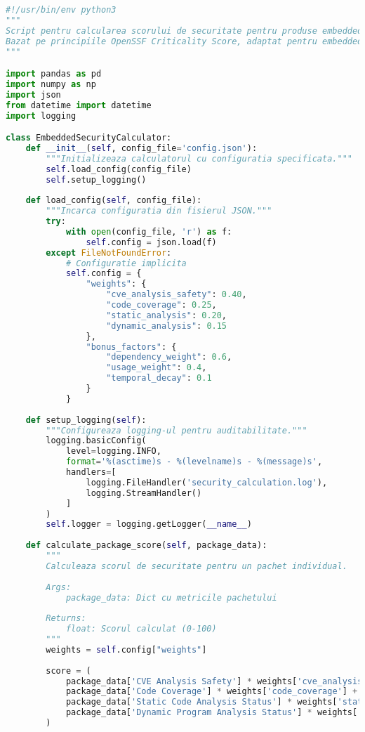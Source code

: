 \documentclass[12pt,a4paper]{article}
\begin{document}
\begin{lstlisting}[language=Python, caption=Script pentru calcularea scorului de securitate, label=lst:security_calculator]
#!/usr/bin/env python3
"""
Script pentru calcularea scorului de securitate pentru produse embedded.
Bazat pe principiile OpenSSF Criticality Score, adaptat pentru embedded security.
"""

import pandas as pd
import numpy as np
import json
from datetime import datetime
import logging

class EmbeddedSecurityCalculator:
    def __init__(self, config_file='config.json'):
        """Initializeaza calculatorul cu configuratia specificata."""
        self.load_config(config_file)
        self.setup_logging()
        
    def load_config(self, config_file):
        """Incarca configuratia din fisierul JSON."""
        try:
            with open(config_file, 'r') as f:
                self.config = json.load(f)
        except FileNotFoundError:
            # Configuratie implicita
            self.config = {
                "weights": {
                    "cve_analysis_safety": 0.40,
                    "code_coverage": 0.25,
                    "static_analysis": 0.20,
                    "dynamic_analysis": 0.15
                },
                "bonus_factors": {
                    "dependency_weight": 0.6,
                    "usage_weight": 0.4,
                    "temporal_decay": 0.1
                }
            }
    
    def setup_logging(self):
        """Configureaza logging-ul pentru auditabilitate."""
        logging.basicConfig(
            level=logging.INFO,
            format='%(asctime)s - %(levelname)s - %(message)s',
            handlers=[
                logging.FileHandler('security_calculation.log'),
                logging.StreamHandler()
            ]
        )
        self.logger = logging.getLogger(__name__)
    
    def calculate_package_score(self, package_data):
        """
        Calculeaza scorul de securitate pentru un pachet individual.
        
        Args:
            package_data: Dict cu metricile pachetului
            
        Returns:
            float: Scorul calculat (0-100)
        """
        weights = self.config["weights"]
        
        score = (
            package_data['CVE Analysis Safety'] * weights['cve_analysis_safety'] +
            package_data['Code Coverage'] * weights['code_coverage'] +
            package_data['Static Code Analysis Status'] * weights['static_analysis'] +
            package_data['Dynamic Program Analysis Status'] * weights['dynamic_analysis']
        )
        

\end{lstlisting}
\end{document}
